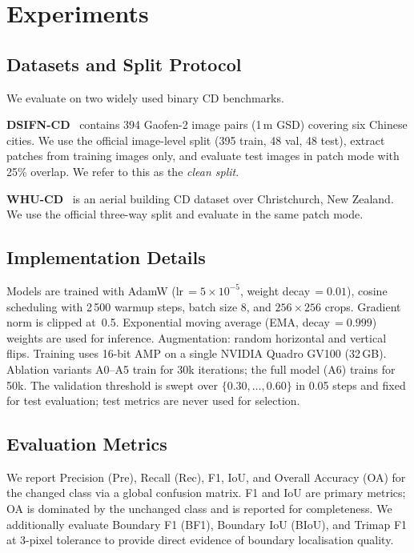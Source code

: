 \section{Experiments}
\label{sec:experiments}

\subsection{Datasets and Split Protocol}
\label{sec:datasets}
We evaluate \ours{} on two widely used binary CD benchmarks.

\textbf{DSIFN-CD}~\cite{shi2022dsamnet} contains 394 Gaofen-2 image pairs (1\,m GSD) covering six Chinese cities. We use the official image-level split (395 train, 48 val, 48 test), extract patches from training images only, and evaluate test images in patch mode with 25\% overlap. We refer to this as the \emph{clean split}.

\textbf{WHU-CD}~\cite{ji2019whu} is an aerial building CD dataset over Christchurch, New Zealand. We use the official three-way split and evaluate in the same patch mode.

\subsection{Implementation Details}
\label{sec:implementation}
Models are trained with AdamW (lr\,$=5\times10^{-5}$, weight decay\,$=0.01$), cosine scheduling with 2\,500 warmup steps, batch size 8, and $256\times256$ crops. Gradient norm is clipped at~0.5. Exponential moving average (EMA, decay\,$=0.999$) weights are used for inference. Augmentation: random horizontal and vertical flips. Training uses 16-bit AMP on a single NVIDIA Quadro GV100 (32\,GB). Ablation variants A0--A5 train for 30k iterations; the full model (A6) trains for 50k. The validation threshold is swept over $\{0.30,\ldots,0.60\}$ in 0.05 steps and fixed for test evaluation; test metrics are never used for selection.

\subsection{Evaluation Metrics}
\label{sec:metrics}
We report Precision (Pre), Recall (Rec), F1, IoU, and Overall Accuracy (OA) for the changed class via a global confusion matrix. F1 and IoU are primary metrics; OA is dominated by the unchanged class and is reported for completeness. We additionally evaluate Boundary F1 (BF1), Boundary IoU (BIoU), and Trimap F1 at 3-pixel tolerance to provide direct evidence of boundary localisation quality.

